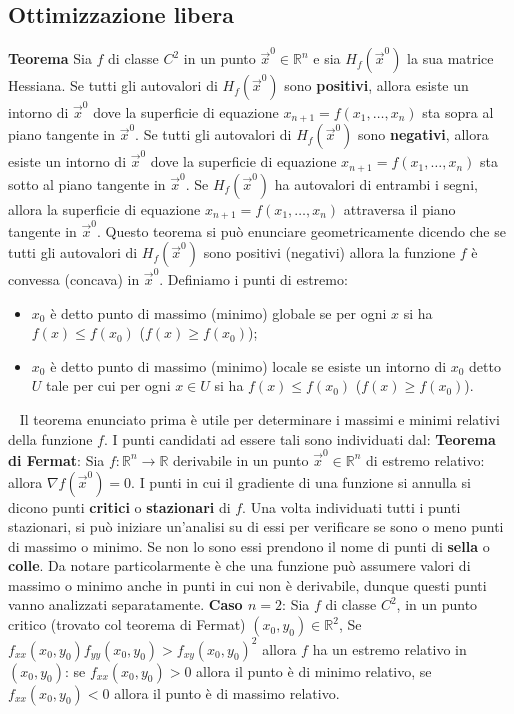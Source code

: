 \subsection{Ottimizzazione libera}
\textbf{Teorema} Sia $f$ di classe $C^2$ in un punto $\vec{x}^0 \in \mathbb{R}^n$ e sia $H_f (\vec{x}^0)$ la sua matrice Hessiana. Se tutti gli autovalori di $H_f(\vec{x}^0)$ sono \textbf{positivi}, allora esiste un intorno di $\vec{x}^0$ dove la superficie di equazione $x_{n+1} = f(x_1,\dots,x_n)$ sta sopra al piano tangente in $\vec{x}^0$. Se tutti gli autovalori di $H_f(\vec{x}^0)$ sono \textbf{negativi}, allora esiste un intorno di $\vec{x}^0$ dove la superficie di equazione $x_{n+1} = f(x_1,\dots,x_n)$ sta sotto al piano tangente in $\vec{x}^0$. Se $H_f(\vec{x}^0)$ ha autovalori di entrambi i segni, allora la superficie di equazione $x_{n+1} = f(x_1,\dots,x_n)$ attraversa il piano tangente in $\vec{x}^0$.\newline
\newline
Questo teorema si può enunciare geometricamente dicendo che se tutti gli autovalori di $H_f(\vec{x}^0)$  sono positivi (negativi) allora la funzione $f$ è convessa (concava) in $\vec{x}^0$.\newline
\newline
Definiamo i punti di estremo:
\begin{itemize}
    \item $x_0$ è detto punto di massimo (minimo) globale se per ogni $x$ si ha $f(x) \leq f(x_0)$ ($f(x) \geq f(x_0)$);
    \item $x_0$ è detto punto di massimo (minimo) locale se esiste un intorno di $x_0$ detto $U$ tale per cui per ogni $x \in U$ si ha $f(x) \leq f(x_0)$ ($f(x) \geq f(x_0)$).
\end{itemize}
\ \newline
Il teorema enunciato prima è utile per determinare i massimi e minimi relativi della funzione $f$. I punti candidati ad essere tali sono individuati dal:\newline
\textbf{Teorema di Fermat}: Sia $f: \mathbb{R}^n \rightarrow  \mathbb{R}$ derivabile in un punto $\vec{x}^0 \in \mathbb{R}^n$ di estremo relativo: allora $\nabla f (\vec{x}^0) = 0$.
\newline
\newline
I punti in cui il gradiente di una funzione si annulla si dicono punti \textbf{critici} o \textbf{stazionari} di $f$. Una volta individuati tutti i punti stazionari, si può iniziare un'analisi su di essi per verificare se sono o meno punti di massimo o minimo. Se non lo sono essi prendono il nome di punti di \textbf{sella} o \textbf{colle}. Da notare particolarmente è che una funzione può assumere valori di massimo o minimo anche in punti in cui non è derivabile, dunque questi punti vanno analizzati separatamente.\newline
\newline
\textbf{Caso $n = 2$}: Sia $f$ di classe $C^2$, in un punto critico (trovato col teorema di Fermat) $(x_0, y_0) \in \mathbb{R}^2$, Se $f_{xx}(x_0,y_0)f_{yy}(x_0,y_0) > f_{xy}(x_0,y_0)^2$ allora $f$ ha un estremo relativo in $(x_0,y_0)$: se $f_{xx} (x_0,y_0) > 0$ allora il punto è di minimo relativo, se $f_{xx}(x_0,y_0) <0$ allora il punto è di massimo relativo.

